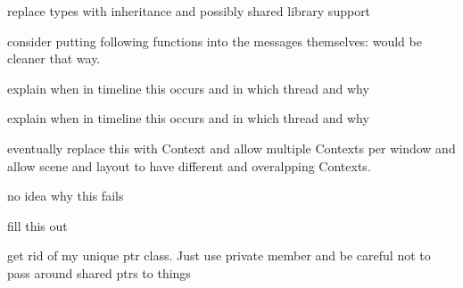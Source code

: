 \begin{DoxyRefList}
replace types with inheritance and possibly shared library support  
\item[\label{todo__todo000001}%
\hypertarget{todo__todo000001}{}%
\-Member \hyperlink{classNeb_1_1app_acefbc3bb3de71f3c8cca0afc1fada857}{\-Neb\-:\-:app\-:\-:recv\-\_\-scene\-\_\-create} (std\-::shared\-\_\-ptr$<$ gal\-::network\-::message $>$)]consider putting following functions into the messages themselves\-: would be cleaner that way.  
\item[\label{todo__todo000003}%
\hypertarget{todo__todo000003}{}%
\-Member \hyperlink{classNeb_1_1Camera_1_1Projection_1_1Base_a7a0ef0507f546a0da56bb596de53c962}{\-Neb\-:\-:\-Camera\-:\-:\-Projection\-:\-:\-Base\-:\-:step} (double)]explain when in timeline this occurs and in which thread and why  
\item[\label{todo__todo000004}%
\hypertarget{todo__todo000004}{}%
\-Member \hyperlink{classNeb_1_1Camera_1_1View_1_1Base_aa3c5978efc6cd916f0f91bb8def375c5}{\-Neb\-:\-:\-Camera\-:\-:\-View\-:\-:\-Base\-:\-:step} (double)=0]explain when in timeline this occurs and in which thread and why  
\item[\label{todo__todo000012}%
\hypertarget{todo__todo000012}{}%
\-Class \hyperlink{classNeb_1_1renderable}{\-Neb\-:\-:renderable} ]eventually replace this with \-Context and allow multiple \-Contexts per window and allow scene and layout to have different and overalpping \-Contexts.  
\item[\label{todo__todo000013}%
\hypertarget{todo__todo000013}{}%
\-Member \hyperlink{classNeb_1_1Scene_1_1desc_aa456a9a431a4f93be8278f6aee75b8f6}{\-Neb\-:\-:\-Scene\-:\-:desc\-:\-:serialize} (\-Archive \&ar, unsigned int const \&version)]no idea why this fails  
\item[\label{todo__todo000016}%
\hypertarget{todo__todo000016}{}%
\-Member \hyperlink{classNeb_1_1Shape_1_1desc_a8356295ceee1f17dd24afbdb455dd206}{\-Neb\-:\-:\-Shape\-:\-:desc\-:\-:operator$<$$<$} (\-Neb\-::\-Shape\-::shape\-\_\-w const \&)]fill this out  
\item[\label{todo__todo000005}%
\hypertarget{todo__todo000005}{}%
\-Member \hyperlink{classNeb_1_1window_1_1window_a04992828fdcd620216728e607654e26a}{\-Neb\-:\-:window\-:\-:window\-:\-:window} (\-Neb\-::window\-::desc\-\_\-s desc)]get rid of my unique ptr class. \-Just use private member and be careful not to pass around shared ptrs to things 
\end{DoxyRefList}